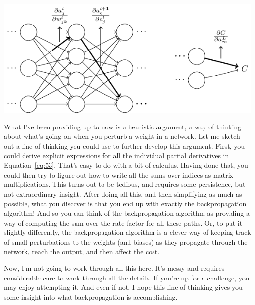 \documentclass[a4paper,twoside,10pt]{book}
\begin{document}
\begin{center}
	\includegraphics[scale=0.5]{./figures/ch2/tikz27}
\end{center}
What I've been providing up to now is a heuristic argument, a way of thinking about what's going on when you perturb a weight in a network. Let me sketch out a line of thinking you could use to further develop this argument. First, you could derive explicit expressions for all the individual partial derivatives in Equation~\ref{eq:53}. That's easy to do with a bit of calculus. Having done that, you could then try to figure out how to write all the sums over indices as matrix multiplications. This turns out to be tedious, and requires some persistence, but not extraordinary insight. After doing all this, and then simplifying as much as possible, what you discover is that you end up with exactly the backpropagation algorithm! And so you can think of the backpropagation algorithm as providing a way of computing the sum over the rate factor for all these paths. Or, to put it slightly differently, the backpropagation algorithm is a clever way of keeping track of small perturbations to the weights (and biases) as they propagate through the network, reach the output, and then affect the cost.

Now, I'm not going to work through all this here. It's messy and requires considerable care to work through all the details. If you're up for a challenge, you may enjoy attempting it. And even if not, I hope this line of thinking gives you some insight into what backpropagation is accomplishing.
\end{document}
